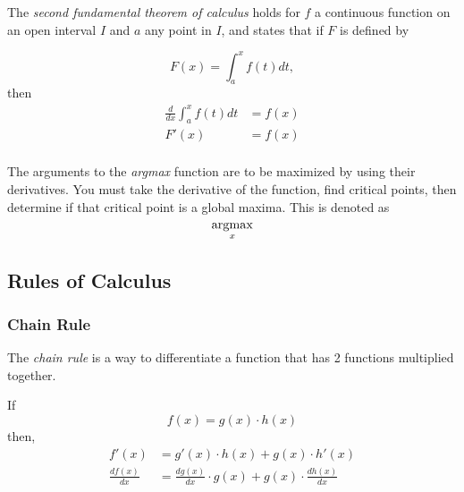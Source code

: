 \begin{definition} \label{def:2nd Fundamental Theorem of Calculus}
  The \emph{second fundamental theorem of calculus} holds for $f$ a continuous function on an open interval $I$ and $a$ any point in $I$, and states that if $F$ is defined by

  \begin{equation*}
    F \left( x \right) = \int_{a}^{x} f \left( t \right) dt,
  \end{equation*}
  then
  \begin{equation} \label{eq:2nd Fundamental Theorem of Calculus}
    \begin{aligned}
      \frac{d}{dx} \int_{a}^{x} f \left( t \right) dt &= f \left( x \right) \\
      F' \left( x \right) &= f \left( x \right) \\
    \end{aligned}
  \end{equation}
\end{definition}
	
\begin{definition}[argmax] \label{def:argmax}
  The arguments to the \emph{argmax} function are to be maximized by using their derivatives.
  You must take the derivative of the function, find critical points, then determine if that critical point is a global maxima.
  This is denoted as
  \begin{equation*} \label{eq:argmax}
    \operatorname*{argmax}_{x}
  \end{equation*}
\end{definition}

\subsection{Rules of Calculus} \label{subsec:Rules of Calculus}
\subsubsection{Chain Rule} \label{subsubsec:Chain Rule}
\begin{definition} \label{def:Chain Rule}
  The \emph{chain rule} is a way to differentiate a function that has 2 functions multiplied together.

  If
  \begin{equation*}
    f(x) = g(x) \cdot h(x)
  \end{equation*}
  then,
  \begin{equation} \label{eq:Chain Rule}
    \begin{aligned}
      f'(x) &= g'(x) \cdot h(x) + g(x) \cdot h'(x) \\
      \frac{df(x)}{dx} &= \frac{dg(x)}{dx} \cdot g(x) + g(x) \cdot \frac{dh(x)}{dx} \\
    \end{aligned}
  \end{equation}
\end{definition}


